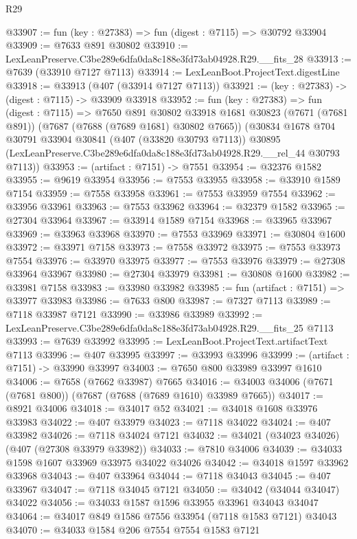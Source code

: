 \begin{lexlean}{R29}
\begin{coremodule}
@33907 := fun (key : @27383) => fun (digest : @7115) => @30792 @33904
@33909 := @7633 @891 @30802
@33910 := LexLeanPreserve.C3be289e6dfa0da8c188e3fd73ab04928.R29.__fits_28
@33913 := @7639 (@33910 @7127 @7113)
@33914 := LexLeanBoot.ProjectText.digestLine
@33918 := @33913 (@407 (@33914 @7127 @7113))
@33921 := (key : @27383) -> (digest : @7115) -> @33909 @33918
@33952 := fun (key : @27383) =>
  fun (digest : @7115) =>
  @7650
    @891
    @30802
    @33918
    @1681
    @30823
    (@7671 (@7681 @891))
    (@7687 (@7688 (@7689 @1681) @30802 @7665))
    (@30834
      @1678
      @704
      @30791
      @33904
      @30841
      (@407 (@33820 @30793 @7113))
      @30895
      (LexLeanPreserve.C3be289e6dfa0da8c188e3fd73ab04928.R29.__rel_44 @30793 @7113))
@33953 := (artifact : @7151) -> @7551
@33954 := @32376 @1582
@33955 := @9619 @33954
@33956 := @7553 @33955
@33958 := @33910 @1589 @7154
@33959 := @7558 @33958
@33961 := @7553 @33959 @7554
@33962 := @33956 @33961
@33963 := @7553 @33962
@33964 := @32379 @1582
@33965 := @27304 @33964
@33967 := @33914 @1589 @7154
@33968 := @33965 @33967
@33969 := @33963 @33968
@33970 := @7553 @33969
@33971 := @30804 @1600
@33972 := @33971 @7158
@33973 := @7558 @33972
@33975 := @7553 @33973 @7554
@33976 := @33970 @33975
@33977 := @7553 @33976
@33979 := @27308 @33964 @33967
@33980 := @27304 @33979
@33981 := @30808 @1600
@33982 := @33981 @7158
@33983 := @33980 @33982
@33985 := fun (artifact : @7151) => @33977 @33983
@33986 := @7633 @800
@33987 := @7327 @7113
@33989 := @7118 @33987 @7121
@33990 := @33986 @33989
@33992 := LexLeanPreserve.C3be289e6dfa0da8c188e3fd73ab04928.R29.__fits_25 @7113
@33993 := @7639 @33992
@33995 := LexLeanBoot.ProjectText.artifactText @7113
@33996 := @407 @33995
@33997 := @33993 @33996
@33999 := (artifact : @7151) -> @33990 @33997
@34003 := @7650 @800 @33989 @33997 @1610
@34006 := @7658 (@7662 @33987) @7665
@34016 := @34003 @34006 (@7671 (@7681 @800)) (@7687 (@7688 (@7689 @1610) @33989 @7665))
@34017 := @8921 @34006
@34018 := @34017 @52
@34021 := @34018 @1608 @33976 @33983
@34022 := @407 @33979
@34023 := @7118 @34022
@34024 := @407 @33982
@34026 := @7118 @34024 @7121
@34032 := @34021 (@34023 @34026) (@407 (@27308 @33979 @33982))
@34033 := @7810 @34006
@34039 := @34033 @1598 @1607 @33969 @33975 @34022 @34026
@34042 := @34018 @1597 @33962 @33968
@34043 := @407 @33964
@34044 := @7118 @34043
@34045 := @407 @33967
@34047 := @7118 @34045 @7121
@34050 := @34042 (@34044 @34047) @34022
@34056 := @34033 @1587 @1596 @33955 @33961 @34043 @34047
@34064 := @34017 @849 @1586 @7556 @33954 (@7118 @1583 @7121) @34043
@34070 := @34033 @1584 @206 @7554 @7554 @1583 @7121

\end{coremodule}
\end{lexlean}
